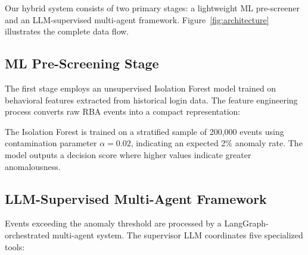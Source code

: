 \documentclass[11pt,twocolumn]{article}
\begin{document}
Our hybrid system consists of two primary stages: a lightweight ML pre-screener and an LLM-supervised multi-agent framework. Figure~\ref{fig:architecture} illustrates the complete data flow.

\subsection{ML Pre-Screening Stage}

The first stage employs an unsupervised Isolation Forest model trained on behavioral features extracted from historical login data. The feature engineering process converts raw RBA events into a compact representation:

\begin{figure}[t]
\centering
{}
\end{figure}

The Isolation Forest is trained on a stratified sample of 200,000 events using contamination parameter $\alpha = 0.02$, indicating an expected 2\% anomaly rate. The model outputs a decision score where higher values indicate greater anomalousness.

\subsection{LLM-Supervised Multi-Agent Framework}

Events exceeding the anomaly threshold are processed by a LangGraph-orchestrated multi-agent system. The supervisor LLM coordinates five specialized tools:
\end{document}
